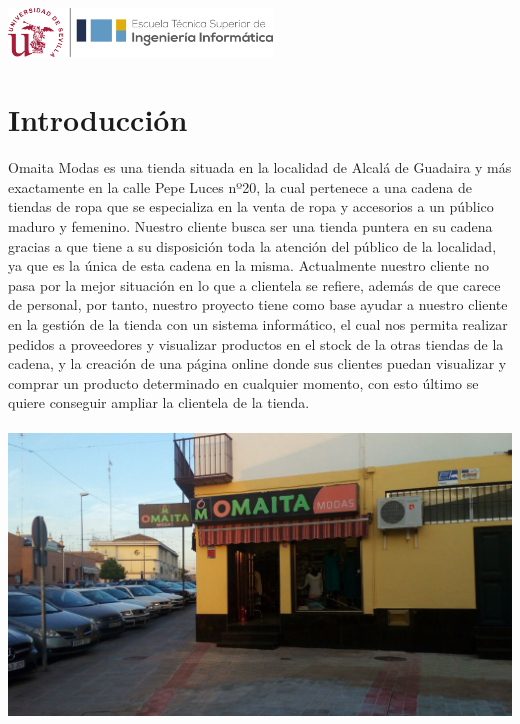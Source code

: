 \begin{titlepage}

\includegraphics[width=7cm]{logo-US.png} %
 

\vfill %

\end{titlepage}

\tableofcontents
\newpage

\section{Introducción}

Omaita Modas es una tienda situada en la localidad de Alcalá de Guadaira y más exactamente en la calle Pepe Luces nº20, la cual pertenece a una cadena de tiendas de ropa que se especializa en la venta de ropa y accesorios a un público maduro y femenino.
Nuestro cliente busca ser una tienda puntera en su cadena gracias a que tiene a su disposición toda la atención del público de la localidad, ya que es la única de esta cadena en la misma. Actualmente nuestro cliente no pasa por la mejor situación en lo que a clientela se refiere, además de que carece de personal, por tanto, nuestro proyecto tiene como base ayudar a nuestro cliente en la gestión de la tienda con un sistema informático, el cual nos permita realizar pedidos a proveedores y visualizar productos en el stock de la otras tiendas de la cadena,  y la creación de una página online donde sus clientes puedan visualizar y comprar un producto determinado en cualquier momento, con esto último se quiere conseguir ampliar la clientela de la tienda.
\\\\
\includegraphics[width=\textwidth, center]{images/tienda1.jpg}

